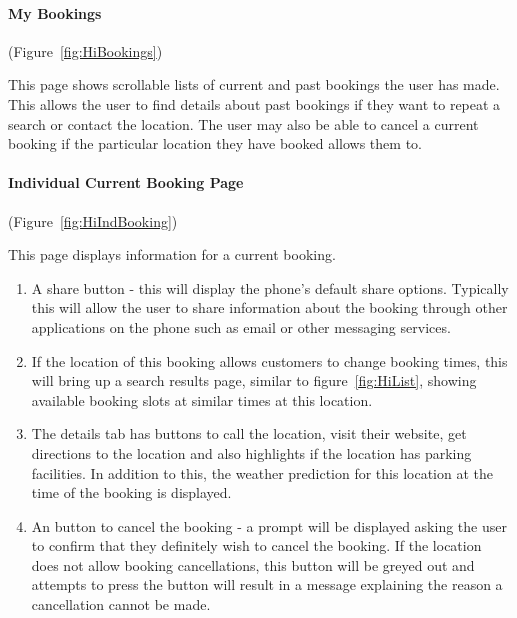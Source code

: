 \paragraph{My Bookings}

(Figure~\ref{fig:HiBookings})


This page shows scrollable lists of current and past bookings the
user has made. This allows the user to find details about past bookings
if they want to repeat a search or contact the location. The user
may also be able to cancel a current booking if the particular location
they have booked allows them to.


\paragraph{Individual Current Booking Page}

(Figure~\ref{fig:HiIndBooking})


This page displays information for a current booking.
\begin{enumerate}
	\item A share button - this will display the phone's default share options.
	      Typically this will allow the user to share information about the
	      booking through other applications on the phone such as email or other
	      messaging services.
	\item If the location of this booking allows customers to change booking
	      times, this will bring up a search results page, similar to figure~\ref{fig:HiList},
	      showing available booking slots at similar times at this location.
	\item The details tab has buttons to call the location, visit their website,
	      get directions to the location and also highlights if the location
	      has parking facilities. In addition to this, the weather prediction
	      for this location at the time of the booking is displayed.
	\item An button to cancel the booking - a prompt will be displayed asking
	      the user to confirm that they definitely wish to cancel the booking.
	      If the location does not allow booking cancellations, this button
	      will be greyed out and attempts to press the button will result in
	      a message explaining the reason a cancellation cannot be made.
\end{enumerate}

